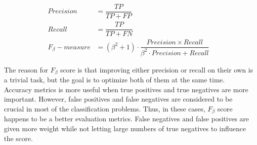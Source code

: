 \begin{align}
    Precision &= \dfrac{TP}{TP + FP} \\
    Recall &= \dfrac{TP}{TP + FN} \\
    F_{\beta}-measure &= (\beta^2 + 1) \cdot \dfrac{Precision \times Recall }{\beta^2 \cdot Precision + Recall} 
\end{align}

The reason for $F_{\beta}$ score is that improving either precision or recall on their own is a trivial task, but the goal is to optimize both of them at the same time. Accuracy metrics is more useful when true positives and true negatives are more important. However, false positives and false negatives are considered to be crucial in most of the classification problems. Thus, in these cases, $F_{\beta}$ score happens to be a  better evaluation metrics. False negatives and false positives are given more weight while not letting large numbers of true negatives to influence the score.

